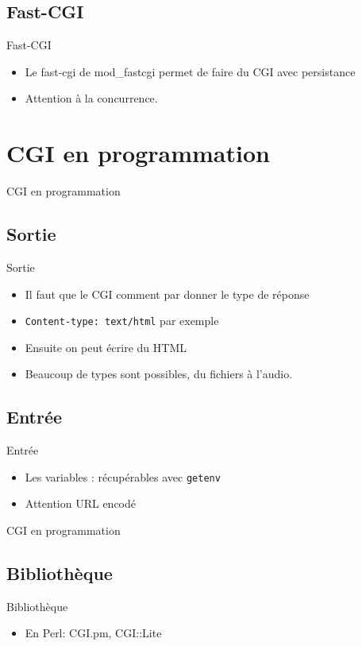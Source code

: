 \begin{frame}{\sectitle}
    \def\subsectitle{Fast-CGI}
    \subsection{\subsectitle}
    \begin{block}{\subsectitle}
        \begin{itemize}
            \item Le fast-cgi de mod\_fastcgi permet de faire du CGI avec
                persistance
            \item Attention à la concurrence.
        \end{itemize}
    \end{block}
\end{frame}

\def\sectitle{CGI en programmation}
\section{\sectitle}
\begin{frame}[containsverbatim]{\sectitle}
    \def\subsectitle{Sortie}
    \subsection{\subsectitle}
    \begin{block}{\subsectitle}
        \begin{itemize}
            \item Il faut que le CGI comment par donner le type de réponse 
            \item \verb+Content-type: text/html+ par exemple
            \item Ensuite on peut écrire du HTML
            \item Beaucoup de types sont possibles, du fichiers à l'audio.
        \end{itemize}
    \end{block}
    \def\subsectitle{Entrée}
    \subsection{\subsectitle}
    \begin{block}{\subsectitle}
        \begin{itemize}
            \item Les variables : récupérables avec \verb+getenv+
            \item Attention URL encodé
        \end{itemize}
    \end{block}
\end{frame}

\begin{frame}{\sectitle}
    \def\subsectitle{Bibliothèque}
    \subsection{\subsectitle}
    \begin{block}{\subsectitle}
        \begin{itemize}
            \itemEn C : cgic
            \item En Perl: CGI.pm, CGI::Lite
        \end{itemize}
    \end{block}
\end{frame}


